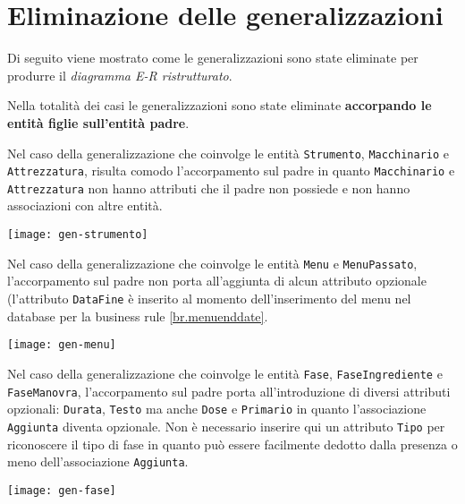 \section{Eliminazione delle generalizzazioni}\label{sec:generalizations}
Di seguito viene mostrato come le generalizzazioni sono state eliminate per produrre
il {\it diagramma E-R ristrutturato}.

Nella totalità dei casi le generalizzazioni sono state eliminate {\bf accorpando
le entità figlie sull'entità padre}.

\vspace{15pt}

Nel caso della generalizzazione che coinvolge le entità {\tt Strumento}, {\tt Macchinario}
e {\tt Attrezzatura}, risulta comodo l'accorpamento sul padre in quanto {\tt Macchinario}
e {\tt Attrezzatura} non hanno attributi che il padre non possiede e non hanno
associazioni con altre entità.

\vspace{5pt}\centerline{\texttt{[image: gen-strumento]}}

\vspace{15pt}

Nel caso della generalizzazione che coinvolge le entità {\tt Menu} e  {\tt MenuPassato},
l'accorpamento sul padre non porta all'aggiunta di alcun attributo opzionale (l'attributo
{\tt DataFine} è inserito al momento dell'inserimento del menu nel database per la business rule \ref{br.menuenddate}.

\vspace{5pt}\centerline{\texttt{[image: gen-menu]}}

\vspace{15pt}

Nel caso della generalizzazione che coinvolge le entità {\tt Fase}, {\tt FaseIngrediente}
e {\tt FaseManovra}, l'accorpamento sul padre porta all'introduzione di diversi attributi
opzionali: {\tt Durata}, {\tt Testo} ma anche {\tt Dose} e {\tt Primario} in quanto l'associazione
{\tt Aggiunta} diventa opzionale. Non è necessario inserire qui un attributo {\tt Tipo} per
riconoscere il tipo di fase in quanto può essere facilmente dedotto dalla presenza o meno
dell'associazione {\tt Aggiunta}.

\vspace{5pt}\centerline{\texttt{[image: gen-fase]}}

\vspace{15pt}

